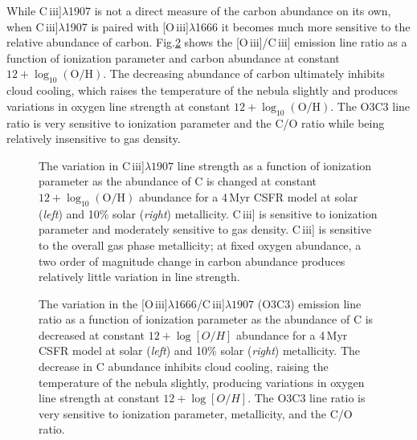 \documentclass[preprint2]{aastex61}
\newcommand{\oiii}{[O\,{\sc iii}]\xspace}
\newcommand{\ciii}{C\,{\sc iii}]\xspace}
\newcommand{\Myr}{$\,$Myr\xspace}
\begin{document}
While \ciii$\lambda$1907 is not a direct measure of the carbon abundance on its own, when \ciii$\lambda$1907 is paired with \oiii$\lambda$1666 it becomes much more sensitive to the relative abundance of carbon. Fig.\ref{fig:COvarB} shows the \oiii/\ciii emission line ratio as a function of ionization parameter and carbon abundance at constant $12 + \log_{10} (\mathrm{O}/\mathrm{H})$. The decreasing abundance of carbon ultimately inhibits cloud cooling, which raises the temperature of the nebula slightly and produces variations in oxygen line strength at constant $12 + \log_{10} (\mathrm{O}/\mathrm{H})$. The O3C3 line ratio is very sensitive to ionization parameter and the C/O ratio while being relatively insensitive to gas density.
\begin{figure}
  \begin{center}
    \caption{The variation in \ciii$\lambda1907$ line strength as a function of ionization parameter as the abundance of C is changed at constant $12+\log_{10}(\mathrm{O}/\mathrm{H})$ abundance for a 4\Myr CSFR model at solar (\emph{left}) and 10\% solar (\emph{right}) metallicity. \ciii is sensitive to ionization parameter and moderately sensitive to gas density. \ciii is sensitive to the overall gas phase metallicity; at fixed oxygen abundance, a two order of magnitude change in carbon abundance produces relatively little variation in line strength.}
    \label{fig:COvarA}
  \end{center}
\end{figure}

\begin{figure}
  \begin{center}
    \caption{The variation in the \oiii$\lambda1666$/\ciii$\lambda1907$ (O3C3) emission line ratio as a function of ionization parameter as the abundance of C is decreased at constant $12+\log[O/H]$ abundance for a 4\Myr CSFR model at solar (\emph{left}) and 10\% solar (\emph{right}) metallicity. The decrease in C abundance inhibits cloud cooling, raising the temperature of the nebula slightly, producing variations in oxygen line strength at constant $12+\log[O/H]$. The O3C3 line ratio is very sensitive to ionization parameter, metallicity, and the C/O ratio.}
    \label{fig:COvarB}
  \end{center}
\end{figure}
\end{document}
